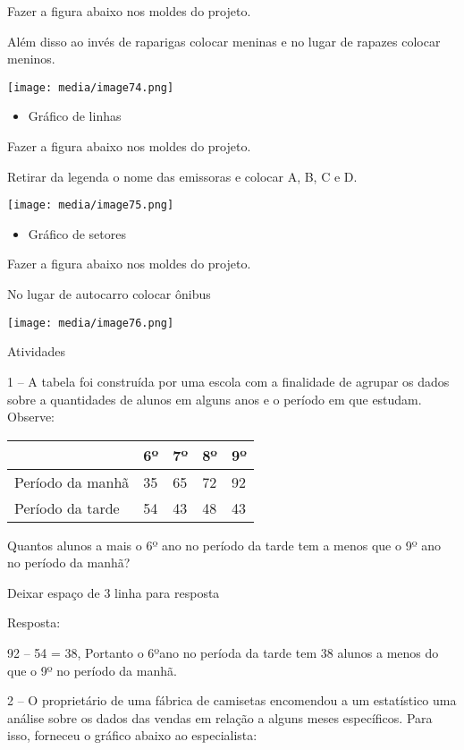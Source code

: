 Fazer a figura abaixo nos moldes do projeto.

Além disso ao invés de raparigas colocar meninas e no lugar de rapazes
colocar meninos.

\texttt{[image: media/image74.png]}

\begin{itemize}
\item
  Gráfico de linhas
\end{itemize}

Fazer a figura abaixo nos moldes do projeto.

Retirar da legenda o nome das emissoras e colocar A, B, C e D.

\texttt{[image: media/image75.png]}

\begin{itemize}
\item
  Gráfico de setores
\end{itemize}

Fazer a figura abaixo nos moldes do projeto.

No lugar de autocarro colocar ônibus

\texttt{[image: media/image76.png]}

Atividades

1 -- A tabela foi construída por uma escola com a finalidade de agrupar
os dados sobre a quantidades de alunos em alguns anos e o período em que
estudam. Observe:

\begin{longtable}[]{@{}lllll@{}}
\toprule
& 6º & 7º & 8º & 9º\tabularnewline
\midrule
\endhead
Período da manhã & 35 & 65 & 72 & 92\tabularnewline
Período da tarde & 54 & 43 & 48 & 43\tabularnewline
\bottomrule
\end{longtable}

Quantos alunos a mais o 6º ano no período da tarde tem a menos que o 9º
ano no período da manhã?

Deixar espaço de 3 linha para resposta

Resposta:

92 -- 54 = 38, Portanto o 6ºano no períoda da tarde tem 38 alunos a
menos do que o 9º no período da manhã.

2 -- O proprietário de uma fábrica de camisetas encomendou a um
estatístico uma análise sobre os dados das vendas em relação a alguns
meses específicos. Para isso, forneceu o gráfico abaixo ao especialista:

